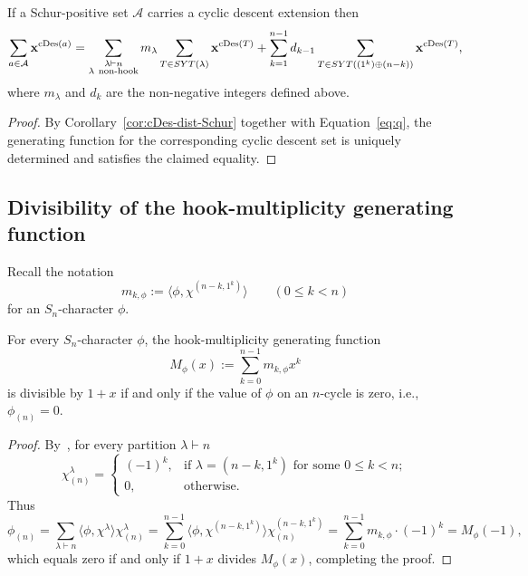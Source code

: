 \documentclass[ALCO,published]{cedram}
\newcommand{\A}{\mathcal A}
\DeclareMathOperator\cDes{cDes}
\def\SYT{{\rm SYT}}
\begin{document}
\begin{corollary}
    If a Schur-positive set $\A$ carries a cyclic descent extension then 
    \[
        \sum_{a\in \A} {\bf x}^{\cDes(a)} = \sum_{\substack{\lambda\vdash n \\ \lambda\ \text{non-hook}}} m_\lambda 
        \sum_{T\in \SYT(\lambda)} {\bf x}^{\cDes(T)} + 	\sum_{k=1}^{n-1} d_{k-1}
        \sum_{T\in \SYT((1^k)\oplus (n-k))}{\bf x}^{\cDes(T)},
    \]
    where $m_\lambda$ and $d_k$ are the non-negative integers defined above.
\end{corollary}

\begin{proof}
    By Corollary~\ref{cor:cDes-dist-Schur}
	together with Equation~\eqref{eq:q}, 
	the generating function for the corresponding cyclic descent set is uniquely determined	and satisfies 
    the claimed equality.
\end{proof}
	
	
\subsection{Divisibility of the hook-multiplicity generating  function}
\label{sec:divisibility}	
	
Recall the notation 
\[
    m_{k,\phi} :=
    \langle \phi,\chi^{(n-k,1^k)} \rangle 
    \qquad (0 \le k < n)
\]
for an $S_n$-character $\phi$.

\begin{lemma}\label{lem:div}
    For every $S_n$-character $\phi$, the hook-multiplicity generating function 
    \[
    M_\phi(x) 
    := \sum\limits_{k=0}^{n-1} m_{k,\phi} x^k
    \]
    is divisible by $1+x$ if and only if 
    the value of $\phi$ on an $n$-cycle is zero, i.e.,  $\phi_{(n)}=0$. 
\end{lemma}

\begin{proof}
    By~\cite[Lemma 4.10.3]{Sagan},  
    for every partition $\lambda\vdash n$ 
    \[
        \chi^\lambda_{(n)} =
        \begin{cases} 
            (-1)^k,&\text{if } \lambda = (n-k,1^k) \text{ for some } 0 \le k < n;\\
		  0,&\text{otherwise.}
		\end{cases}
    \]
    Thus   
    \[
        \phi_{(n)}
        = \sum\limits_{\lambda\vdash n} \langle \phi,\chi^\lambda \rangle \chi^\lambda_{(n)}
        = \sum\limits_{k=0}^{n-1} \langle \phi,\chi^{(n-k,1^k)} \rangle \chi^{(n-k,1^k)}_{(n)}
        = \sum\limits_{k=0}^{n-1} m_{k,\phi} \cdot (-1)^k
        = M_\phi(-1),
    \]
    which equals zero if and only if $1+x$ divides $ M_\phi(x)$, 
    completing the proof.
\end{proof}
\end{document}

